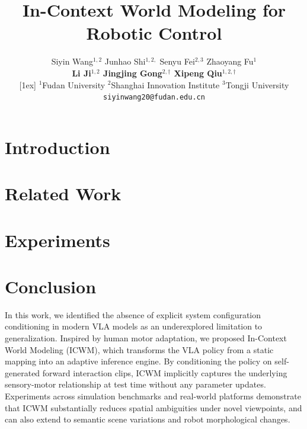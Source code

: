 \documentclass[]{openmoss}
\title{In-Context World Modeling for Robotic Control}
\author{
Siyin Wang$^{1,2}$ \hspace{.3em}
Junhao Shi$^{1,2,}$\hspace{.3em}
Senyu Fei$^{2,3}$ \hspace{.1em}
Zhaoyang Fu$^{1}$
\\
\textbf{
Li Ji$^{1,2}$ \hspace{.1em}
Jingjing Gong$^{2,\dagger}$ \hspace{.1em}
Xipeng Qiu$^{1,2,\dagger}$ \hspace{.1em}
}
\\
[1ex]
\normalfont
$^{1}$Fudan University   
$^{2}$Shanghai Innovation Institute  
$^{3}$Tongji University  
\\
\texttt{siyinwang20@fudan.edu.cn} \\
}
\begin{document}
\maketitle
\begingroup
\renewcommand{\thefootnote}{\fnsymbol{footnote}}
\endgroup



\section{Introduction}


\section{Related Work}




\section{Experiments}


\section{Conclusion}

In this work, we identified the absence of explicit system configuration conditioning in modern VLA models as an underexplored limitation to generalization. 
Inspired by human motor adaptation, we proposed In-Context World Modeling (ICWM), which transforms the VLA policy from a static mapping into an adaptive inference engine. 
By conditioning the policy on self-generated forward interaction clips, ICWM implicitly captures the underlying sensory-motor relationship at test time without any parameter updates.
Experiments across simulation benchmarks and real-world platforms demonstrate that ICWM substantially reduces spatial ambiguities under novel viewpoints, and can also extend to semantic scene variations and robot morphological changes.
\end{document}
